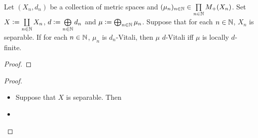 \documentclass{book}
\begin{document}
	\begin{ex}
		Let $(X_n, d_n)$ be a collection of metric spaces and $(\mu_n)_{n \in \mathbb{N}} \in \prod\limits_{n \in \mathbb{N}} M_+(X_n)$. Set $X \vcentcolon= \coprod\limits_{n \in \mathbb{N}} X_n$, $d \vcentcolon= \bigoplus\limits_{n \in \mathbb{N}} d_n$ and $\mu \vcentcolon= \bigoplus_{n \in \mathbb{N}} \mu_n$.  Suppose that for each $n \in \mathbb{N}$, $X_n$ is separable. If for each $n \in \mathbb{N}$, $\mu_n$ is $d_n$-Vitali, then $\mu$ $d$-Vitali iff $\mu$ is locally $d$-finite.
	\end{ex}
	
	\begin{proof}
		  
	\end{proof}
	
	\begin{proof}\
		\begin{itemize}
			\item Suppose that $X$ is separable. Then 
			\item 
		\end{itemize}
	\end{proof}

	
	
	
	
	
	
	
	
	
	
	
	
	
	
	
	
	
	
	
	
	
	
	
	
	
	
	
	
	
	
	
	
	
	
	
	
	
	
	
	
	
	
	
	
	
	
	
	
	
	
	
	
	
	
	
	
	
	
	
	
	
	
	
	
\end{document}
